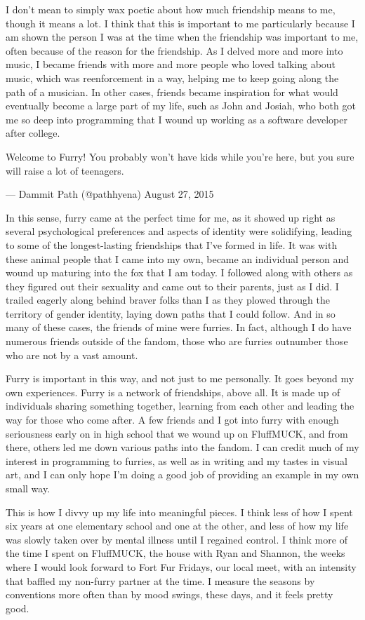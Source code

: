 I don't mean to simply wax poetic about how much friendship means to me,
though it means a lot. I think that this is important to me particularly
because I am shown the person I was at the time when the friendship was
important to me, often because of the reason for the friendship. As I
delved more and more into music, I became friends with more and more
people who loved talking about music, which was reenforcement in a way,
helping me to keep going along the path of a musician. In other cases,
friends became inspiration for what would eventually become a large part
of my life, such as John and Josiah, who both got me so deep into
programming that I wound up working as a software developer after
college.

Welcome to Furry! You probably won't have kids while you're here, but
you sure will raise a lot of teenagers.

--- Dammit Path (@pathhyena) August 27, 2015

In this sense, furry came at the perfect time for me, as it showed up
right as several psychological preferences and aspects of identity were
solidifying, leading to some of the longest-lasting friendships that
I've formed in life. It was with these animal people that I came into my
own, became an individual person and wound up maturing into the fox that
I am today. I followed along with others as they figured out their
sexuality and came out to their parents, just as I did. I trailed
eagerly along behind braver folks than I as they plowed through the
territory of gender identity, laying down paths that I could follow. And
in so many of these cases, the friends of mine were furries. In fact,
although I do have numerous friends outside of the fandom, those who are
furries outnumber those who are not by a vast amount.

Furry is important in this way, and not just to me personally. It goes
beyond my own experiences. Furry is a network of friendships, above all.
It is made up of individuals sharing something together, learning from
each other and leading the way for those who come after. A few friends
and I got into furry with enough seriousness early on in high school
that we wound up on FluffMUCK, and from there, others led me down
various paths into the fandom. I can credit much of my interest in
programming to furries, as well as in writing and my tastes in visual
art, and I can only hope I'm doing a good job of providing an example in
my own small way.

This is how I divvy up my life into meaningful pieces. I think less of
how I spent six years at one elementary school and one at the other, and
less of how my life was slowly taken over by mental illness until I
regained control. I think more of the time I spent on FluffMUCK, the
house with Ryan and Shannon, the weeks where I would look forward to
Fort Fur Fridays, our local meet, with an intensity that baffled my
non-furry partner at the time. I measure the seasons by conventions more
often than by mood swings, these days, and it feels pretty good.

